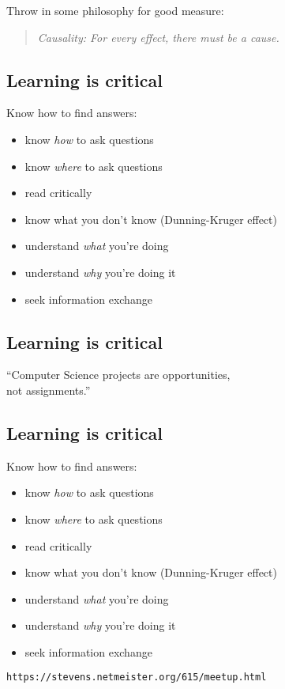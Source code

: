 \documentclass[xga]{xdvislides}
\begin{document}
Throw in some philosophy for good measure:
\begin{quote}
{\em Causality: For every effect, there must be a cause.}
\end{quote}
\Normalsize

\subsection{Learning is critical}
Know how to find answers:
\begin{itemize}
	\item know {\em how} to ask questions
	\item know {\em where} to ask questions
	\item read critically
	\item know what you don't know (Dunning-Kruger effect)
	\item understand {\em what} you're doing
	\item understand {\em why} you're doing it
	\item seek information exchange
\end{itemize}

\subsection{Learning is critical}
\vspace{1in}
\Huge
\begin{center}
``Computer Science projects are opportunities, \\
not assignments.'' \\
\end{center}
\Normalsize

\subsection{Learning is critical}
Know how to find answers:
\begin{itemize}
	\item know {\em how} to ask questions
	\item know {\em where} to ask questions
	\item read critically
	\item know what you don't know (Dunning-Kruger effect)
	\item understand {\em what} you're doing
	\item understand {\em why} you're doing it
	\item seek information exchange
\end{itemize}
\vspace{.5in}
\verb+https://stevens.netmeister.org/615/meetup.html+
\end{document}
